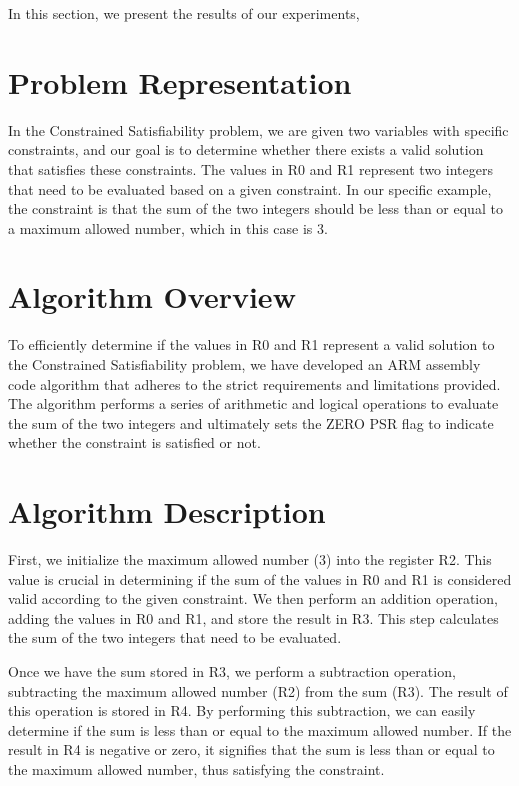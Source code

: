 In this section, we present the results of our experiments,

\section{Problem Representation}

In the Constrained Satisfiability problem, we are given two variables with specific constraints, and our goal is to determine whether there exists a valid solution that satisfies these constraints. The values in R0 and R1 represent two integers that need to be evaluated based on a given constraint. In our specific example, the constraint is that the sum of the two integers should be less than or equal to a maximum allowed number, which in this case is 3.

\section{Algorithm Overview}

To efficiently determine if the values in R0 and R1 represent a valid solution to the Constrained Satisfiability problem, we have developed an ARM assembly code algorithm that adheres to the strict requirements and limitations provided. The algorithm performs a series of arithmetic and logical operations to evaluate the sum of the two integers and ultimately sets the ZERO PSR flag to indicate whether the constraint is satisfied or not.

\section{Algorithm Description}

First, we initialize the maximum allowed number (3) into the register R2. This value is crucial in determining if the sum of the values in R0 and R1 is considered valid according to the given constraint. We then perform an addition operation, adding the values in R0 and R1, and store the result in R3. This step calculates the sum of the two integers that need to be evaluated.

Once we have the sum stored in R3, we perform a subtraction operation, subtracting the maximum allowed number (R2) from the sum (R3). The result of this operation is stored in R4. By performing this subtraction, we can easily determine if the sum is less than or equal to the maximum allowed number. If the result in R4 is negative or zero, it signifies that the sum is less than or equal to the maximum allowed number, thus satisfying the constraint.

